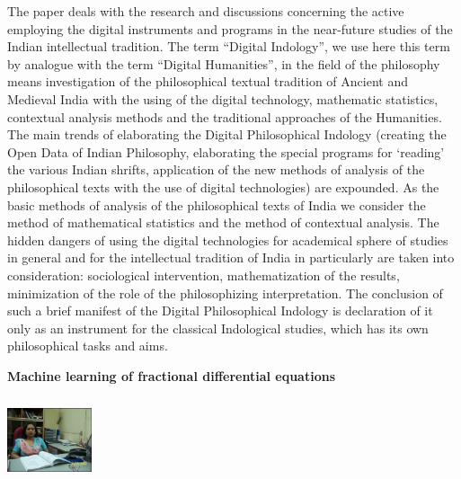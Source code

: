 \documentclass[twoside,11pt]{amsart}
\begin{document}
\vskip 8mm
The paper deals with the research and discussions concerning the active employing the digital instruments and programs in the near-future studies of the Indian intellectual tradition. The term “Digital Indology”, we use here this term by analogue with the term “Digital Humanities”, in the field of the philosophy means investigation of the philosophical textual tradition of Ancient and Medieval India with the using of the digital technology, mathematic statistics, contextual analysis methods and the traditional approaches of the Humanities. The main trends of elaborating the Digital Philosophical Indology (creating the Open Data of Indian Philosophy, elaborating the special programs for ‘reading’ the various Indian shrifts, application of the new methods of analysis of the philosophical texts with the use of digital technologies) are expounded. As the basic methods of analysis of the philosophical texts of India we consider the method of mathematical statistics and the method of contextual analysis. The hidden dangers of using the digital technologies for academical sphere of studies in general and for the intellectual tradition of India in particularly are taken into consideration: sociological intervention, mathematization of the results, minimization of the role of the philosophizing interpretation. The conclusion of such a brief manifest of the Digital Philosophical Indology is declaration of it only as an instrument for the classical Indological studies, which has its own philosophical tasks and aims.
\vskip 5mm
\begin{flushleft}
{\bf }
\end{flushleft}
\newpage

\vskip 10mm
\begin{center}\bf\LARGE
Machine learning of fractional differential equations

\end{center}
\vskip 5mm
\begin{center}
\includegraphics[width=2.5cm, height=2.5cm, keepaspectratio=false]{Mani2.jpg}
\end{center}
\vskip 2mm
\end{document}

